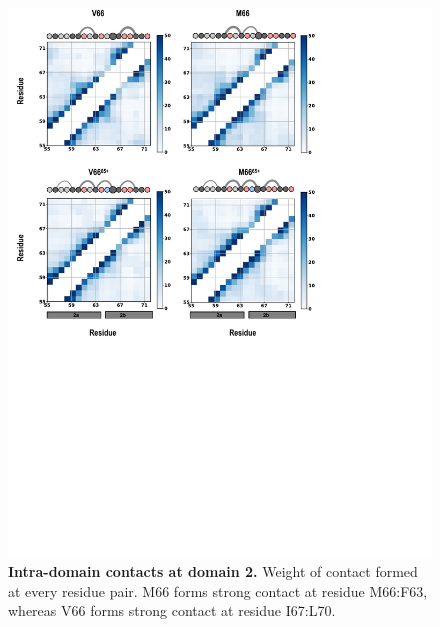 \documentclass[10pt,letterpaper]{article}
\begin{document}
\begin{figure}[!ht]
\includegraphics[scale=0.5,width=12cm,trim={0 0cm 0 0cm},clip]{../figures/fig-3-1.pdf}

\caption{{\bf Intra-domain contacts at domain 2.}
Weight of contact formed at every residue pair. M66 forms strong contact at residue M66:F63, whereas V66 forms strong contact at residue I67:L70.}
\label{fig5} 
\end{figure}
\end{document}
